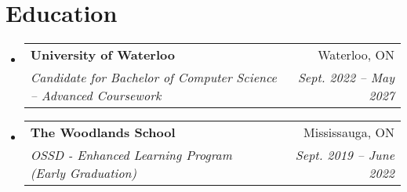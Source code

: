 \documentclass[letterpaper,11pt]{article}
\makeatletter
\newcommand{\resumeSubheading}[4]{
  \vspace{-2pt}\item
    \begin{tabular*}{0.97\textwidth}[t]{l@{\extracolsep{\fill}}r}
      \textbf{#1} & #2 \\
      \textit{\small#3} & \textit{\small #4} \\
    \end{tabular*}\vspace{-7pt}
}
\newcommand{\resumeSubHeadingListStart}{\begin{itemize}[leftmargin=0.15in, label={}]}
\newcommand{\resumeSubHeadingListEnd}{\end{itemize}}
\makeatother
\begin{document}
\section{Education}
  \resumeSubHeadingListStart
    \resumeSubheading
      {University of Waterloo}{Waterloo, ON}
      {Candidate for Bachelor of Computer Science -- Advanced Coursework}{Sept. 2022 -- May 2027}
  \resumeSubheading
      {The Woodlands School}{Mississauga, ON}
      {OSSD - Enhanced Learning Program (Early Graduation)}{Sept. 2019 -- June 2022}
  \resumeSubHeadingListEnd
\end{document}
